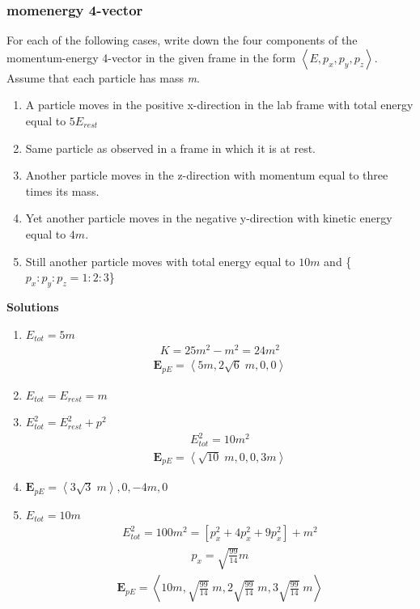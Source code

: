 \documentclass[12pt]{book}
\newcommand{\sqbkt}[1]{\left[ #1 \right]}
\newcommand{\tribkt}[1]{\left< #1 \right>}
\begin{document}
\subsubsection{momenergy 4-vector}
For each of the following cases, write down the four components of the momentum-energy 4-vector in the given frame in the form $\tribkt{E,p_x,p_y,p_z}$. Assume that each particle has mass \textit{m}. 
\begin{enumerate}
    \item A particle moves in the positive x-direction in the lab frame with total energy equal to $5E_{rest}$
    \item Same particle as observed in a frame in which it is at rest.
    \item Another particle moves in the z-direction with momentum equal to three times its mass.
    \item Yet another particle moves in the negative y-direction with kinetic energy equal to $4m$.
    \item Still another particle moves with total energy equal to $10m$ and \{$p_x:p_y:p_z = 1:2:3$\}
\end{enumerate}
\textbf{Solutions}
\begin{enumerate}
    \item \(E_{tot}=5m\)
    \begin{align}
    K = 25m^2 - m^2 = 24m^2
    \end{align}
    \begin{align}
    \textbf{E}_{pE} = \tribkt{5m,2\sqrt{6}\;m,0,0}
    \end{align}
    \item \( E_{tot} = E_{rest} = m\)
    \item \(E_{tot}^2 = E_{rest}^2 + p^2\)
    \begin{align}
    E_{tot}^2 = 10m^2
    \end{align}
    \begin{align}
    \textbf{E}_{pE} = \tribkt{\sqrt{10}\; m, 0,0,3m}
    \end{align}
    \item \( \textbf{E}_{pE} = \tribkt{3\sqrt{3}\; m},0,-4m,0\)
    \item \(E_{tot} = 10m\)
    \begin{align}
    E_{tot}^2 = 100m^2 = \sqbkt{p_x^2+4p_x^2+9p_x^2}+m^2
    \end{align}
    \begin{align}
    p_x = \sqrt{\frac{99}{14}}m
    \end{align}
    \begin{align}
    \textbf{E}_{pE} = \tribkt{10m,\sqrt{\frac{99}{14}}\;m,2\sqrt{\frac{99}{14}}\;m,3\sqrt{\frac{99}{14}}\;m}
    \end{align}

\end{enumerate}
\end{document}
